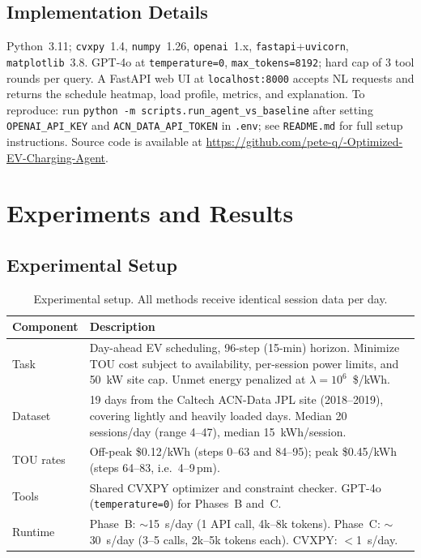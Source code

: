 \documentclass{article}
\begin{document}
\subsection{Implementation Details}

Python~3.11; \texttt{cvxpy}~1.4, \texttt{numpy}~1.26, \texttt{openai}~1.x, \texttt{fastapi}+\texttt{uvicorn}, \texttt{matplotlib}~3.8. GPT-4o at \texttt{temperature=0}, \texttt{max\_tokens=8192}; hard cap of 3 tool rounds per query. A FastAPI web UI at \texttt{localhost:8000} accepts NL requests and returns the schedule heatmap, load profile, metrics, and explanation. To reproduce: run \texttt{python -m scripts.run\_agent\_vs\_baseline} after setting \texttt{OPENAI\_API\_KEY} and \texttt{ACN\_DATA\_API\_TOKEN} in \texttt{.env}; see \texttt{README.md} for full setup instructions. Source code is available at \url{https://github.com/pete-q/-Optimized-EV-Charging-Agent}.

\section{Experiments and Results}

\subsection{Experimental Setup}

\begin{table}[ht]
\centering\small
\begin{tabularx}{\linewidth}{l X}
\toprule
Component & Description \\
\midrule
Task     & Day-ahead EV scheduling, 96-step (15-min) horizon. Minimize TOU cost subject to availability, per-session power limits, and 50~kW site cap. Unmet energy penalized at $\lambda=10^6$~\$/kWh. \\
Dataset  & 19 days from the Caltech ACN-Data JPL site (2018--2019), covering lightly and heavily loaded days. Median 20 sessions/day (range 4--47), median 15~kWh/session. \\
TOU rates & Off-peak \$0.12/kWh (steps 0--63 and 84--95); peak \$0.45/kWh (steps 64--83, i.e.\ 4--9\,pm). \\
Tools    & Shared CVXPY optimizer and constraint checker. GPT-4o (\texttt{temperature=0}) for Phases~B and~C. \\
Runtime  & Phase~B: $\sim$15~s/day (1 API call, 4k--8k tokens). Phase~C: $\sim$30~s/day (3--5 calls, 2k--5k tokens each). CVXPY: $<$1~s/day. \\
\bottomrule
\end{tabularx}
\caption{Experimental setup. All methods receive identical session data per day.}
\label{tab:setup}
\end{table}
\end{document}
